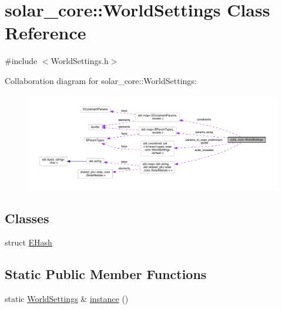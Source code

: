 \hypertarget{classsolar__core_1_1_world_settings}{}\section{solar\+\_\+core\+:\+:World\+Settings Class Reference}
\label{classsolar__core_1_1_world_settings}


{\ttfamily \#include $<$World\+Settings.\+h$>$}



Collaboration diagram for solar\+\_\+core\+:\+:World\+Settings\+:
\nopagebreak
\begin{figure}[H]
\begin{center}
\leavevmode
\includegraphics[width=350pt]{classsolar__core_1_1_world_settings__coll__graph}
\end{center}
\end{figure}
\subsection*{Classes}
\begin{DoxyCompactItemize}
\item 
struct \hyperlink{structsolar__core_1_1_world_settings_1_1_e_hash}{E\+Hash}
\end{DoxyCompactItemize}
\subsection*{Static Public Member Functions}
\begin{DoxyCompactItemize}
\item 
static \hyperlink{classsolar__core_1_1_world_settings}{World\+Settings} \& \hyperlink{classsolar__core_1_1_world_settings_a719e11b52a0e087f8c0dd11d9f65da88}{instance} ()
\end{DoxyCompactItemize}
